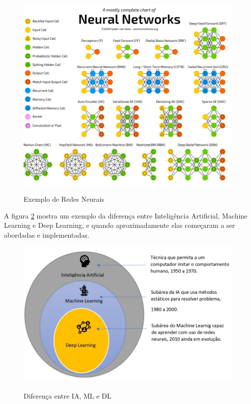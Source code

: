 \begin{figure}[H]
  \centering
  \caption{Exemplo de Redes Neurais}
  \includegraphics[scale=.2]{figs/neuralNetwork.jpg}
  \label{fig:exRedeNeural}
\end{figure}

A figura \ref{fig:iamldl} mostra um exemplo da diferença entre Inteligência Artificial, Machine Learning e Deep Learning, e quando aproximadamente elas começaram a ser abordadas e implementadas.

\begin{figure}[H]
  \centering
  \caption{Diferença entre IA, ML e DL}
  \includegraphics[scale=.7]{figs/IA-ML-DL.jpg}
  \label{fig:iamldl}
\end{figure}

